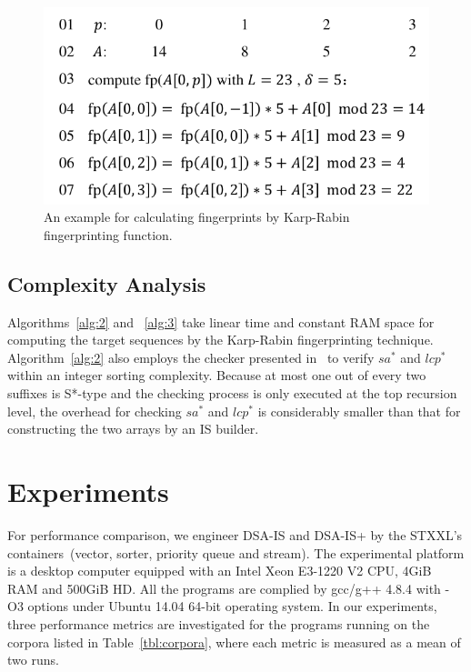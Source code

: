 \documentclass[10pt,journal,compsoc]{IEEEtran}
\begin{document}
\begin{figure}[htbp!]
	\centering
	
	\includegraphics[width = 1\columnwidth]{example2.pdf}
	
	\caption{An example for calculating fingerprints by Karp-Rabin fingerprinting function.}
	
	\label{fig:example2}
	
\end{figure}

\subsection{Complexity Analysis}

Algorithms~\ref{alg:2} and ~\ref{alg:3} take linear time and constant RAM space for computing the target sequences by the Karp-Rabin fingerprinting technique. Algorithm~\ref{alg:2} also employs the checker presented in~\cite{wu2017} to verify $sa^*$ and $lcp^*$ within an integer sorting complexity. Because at most one out of every two suffixes is S*-type and the checking process is only executed at the top recursion level, the overhead for checking $sa^*$ and $lcp^*$ is considerably smaller than that for constructing the two arrays by an IS builder.

\section{Experiments} \label{sec:experiments}

For performance comparison, we engineer DSA-IS and DSA-IS+ by the STXXL's containers~(vector, sorter, priority queue and stream). The experimental platform is a desktop computer equipped with an Intel Xeon E3-1220 V2 CPU, 4GiB RAM and 500GiB HD. All the programs are complied by gcc/g++ 4.8.4 with -O3 options under Ubuntu 14.04 64-bit operating system. In our experiments, three performance metrics are investigated for the programs running on the corpora listed in Table~\ref{tbl:corpora}, where each metric is measured as a mean of two runs.
\end{document}

